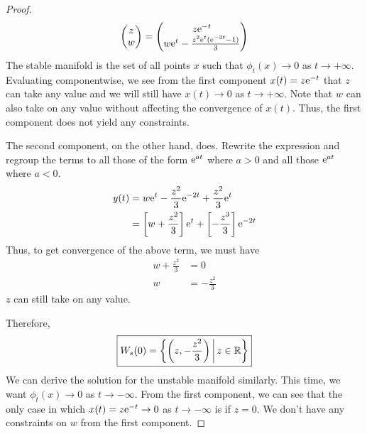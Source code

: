 \documentclass[../psets.tex]{subfiles}
\begin{document}
\begin{enumerate}
\begin{enumerate}
\begin{proof}
\begin{equation*}
{                    \begin{pmatrix}
                        z\\
                        w\\
                    \end{pmatrix}
                    =
                    \begin{pmatrix}
                        z\e[-t]\\
                        w\e[t]-\frac{z^2\e[t](\e[-3t]-1)}{3}\\
                    \end{pmatrix}
                }
            \end{equation*}
            The stable manifold is the set of all points $x$ such that $\phi_t(x)\to 0$ as $t\to +\infty$. Evaluating componentwise, we see from the first component $x(t)=z\e[-t]$ that $z$ can take any value and we will still have $x(t)\to 0$ as $t\to +\infty$. Note that $w$ can also take on any value without affecting the convergence of $x(t)$. Thus, the first component does not yield any constraints.\par
            The second component, on the other hand, does. Rewrite the expression and regroup the terms to all those of the form $\e[at]$ where $a>0$ and all those $\e[at]$ where $a<0$.
            \begin{align*}
                y(t) &= w\e[t]-\frac{z^2}{3}\e[-2t]+\frac{z^2}{3}\e[t]\\
                &= \left[ w+\frac{z^2}{3} \right]\e[t]+\left[ -\frac{z^3}{3} \right]\e[-2t]
            \end{align*}
            Thus, to get convergence of the above term, we must have
            \begin{align*}
                w+\frac{z^2}{3} &= 0\\
                w &= -\frac{z^2}{3}
            \end{align*}
            $z$ can still take on any value.\par
            Therefore,
            \begin{equation*}
                \boxed{W_s(0) = \left\{ \left( z,-\frac{z^2}{3} \right) \,\middle|\, z\in\R \right\}}
            \end{equation*}
            We can derive the solution for the unstable manifold similarly. This time, we want $\phi_t(x)\to 0$ as $t\to -\infty$. From the first component, we can see that the only case in which $x(t)=z\e[-t]\to 0$ as $t\to -\infty$ is if $z=0$. We don't have any constraints on $w$ from the first component.\par

\end{proof}
\end{enumerate}
\end{enumerate}
\end{document}
